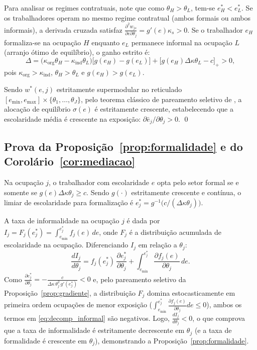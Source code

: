 Para analisar os regimes contratuais, note que como $\theta_H > \theta_L$, tem-se $e_H^* < e_L^*$. Se os trabalhadores operam no mesmo regime contratual (ambos formais ou ambos informais), a derivada cruzada satisfaz $\frac{\partial^2 w_{js}}{\partial e \partial \theta_j} = g'(e)\kappa_s > 0$. Se o trabalhador $e_H$ formaliza-se na ocupação $H$ enquanto $e_L$ permanece informal na ocupação $L$ (arranjo ótimo de equilíbrio), o ganho estrito é:
\begin{equation}
    \Delta = \big(\kappa_{\text{org}}\theta_H - \kappa_{\text{ind}}\theta_L\big)\big[g(e_H) - g(e_L)\big] + \big[g(e_H)\Delta\kappa\theta_L - c\big]_+ > 0,
\end{equation}
pois $\kappa_{\text{org}} > \kappa_{\text{ind}}$, $\theta_H > \theta_L$ e $g(e_H) > g(e_L)$.

Sendo $w^*(e, j)$ estritamente supermodular no reticulado $[e_{\min}, e_{\max}] \times \{\theta_1, \dots, \theta_J\}$, pelo teorema clássico de pareamento seletivo de \citet{becker1973theory}, a alocação de equilíbrio $\sigma(e)$ é estritamente crescente, estabelecendo que a escolaridade média é crescente na exposição: $\partial \bar{e}_j / \partial \theta_j > 0$. \qed

\subsection{Prova da Proposição~\ref{prop:formalidade} e do Corolário~\ref{cor:mediacao}}

Na ocupação $j$, o trabalhador com escolaridade $e$ opta pelo setor formal se e somente se $g(e)\Delta\kappa\theta_j \ge c$. Sendo $g(\cdot)$ estritamente crescente e contínua, o limiar de escolaridade para formalização é $e^*_j = g^{-1}\big(c / (\Delta\kappa \theta_j)\big)$.

A taxa de informalidade na ocupação $j$ é dada por $I_j = F_j(e^*_j) = \int_{e_{\min}}^{e^*_j} f_j(e) \, de$, onde $F_j$ é a distribuição acumulada de escolaridade na ocupação. Diferenciando $I_j$ em relação a $\theta_j$:
\begin{equation}
    \frac{d I_j}{d \theta_j} = f_j(e^*_j) \, \frac{\partial e^*_j}{\partial \theta_j} + \int_{e_{\min}}^{e^*_j} \frac{\partial f_j(e)}{\partial \theta_j} \, de.
    \label{eq:decomp_informal}
\end{equation}
Como $\frac{\partial e^*_j}{\partial \theta_j} = -\frac{c}{\Delta\kappa \, \theta_j^2 \, g'(e^*_j)} < 0$ e, pelo pareamento seletivo da Proposição~\ref{prop:gradiente}, a distribuição $F_j$ domina estocasticamente em primeira ordem ocupações de menor exposição ($\int_{e_{\min}}^{e^*_j} \frac{\partial f_j(e)}{\partial \theta_j} de \le 0$), ambos os termos em \eqref{eq:decomp_informal} são negativos. Logo, $\frac{d I_j}{d \theta_j} < 0$, o que comprova que a taxa de informalidade é estritamente decrescente em $\theta_j$ (e a taxa de formalidade é crescente em $\theta_j$), demonstrando a Proposição~\ref{prop:formalidade}.

